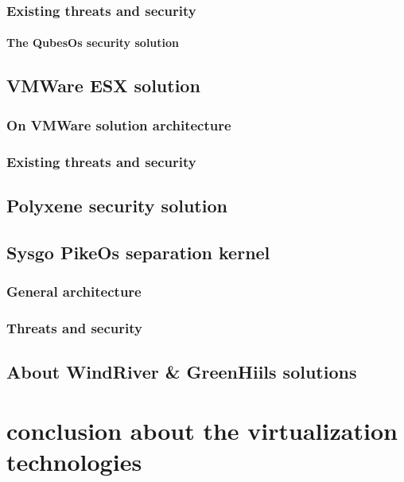 \subsubsection{Existing threats and security}

\paragraph{The QubesOs security solution}

\subsection{VMWare ESX solution}

\subsubsection{On VMWare solution architecture}

\subsubsection{Existing threats and security}

\subsection{Polyxene security solution}

\subsection{Sysgo PikeOs separation kernel}

\subsubsection{General architecture}

\subsubsection{Threats and security}

\subsection{About WindRiver \& GreenHiils solutions}

\section{conclusion about the virtualization technologies}
